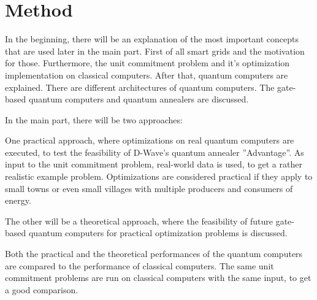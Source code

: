 \section{Method}

In the beginning, there will be an explanation of the most important concepts
that are used later in the main part.
First of all smart grids and the motivation for those.
Furthermore, the unit commitment problem and it's optimization implementation on classical computers.
After that, quantum computers are explained. There are different architectures of quantum computers.
The gate-based quantum computers and quantum annealers are discussed.

\noindent In the main part, there will be two approaches:

One practical approach, where optimizations on real quantum computers are executed,
to test the feasibility of D-Wave's quantum annealer ''Advantage''.
As input to the unit commitment problem, real-world data is used, to get a rather realistic example problem.
Optimizations are considered practical if they apply to small towns or even small villages
with multiple producers and consumers of energy.

The other will be a theoretical approach, where the feasibility of future gate-based quantum computers
for practical optimization problems is discussed.

Both the practical and the theoretical performances of the quantum computers
are compared to the performance of classical computers.
The same unit commitment problems are run on classical computers with the same input, to get a good comparison.
